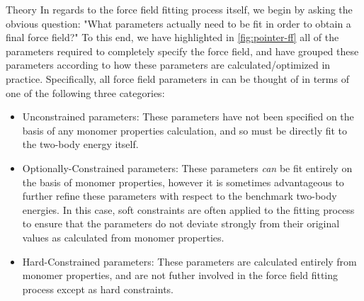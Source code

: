 \begin{subsection}{Theory}
In regards to the force field fitting process itself, we begin by asking the obvious
question: "What parameters actually need to be fit in order to obtain a final
force field?" To this end, we have highlighted in \cref{fig:pointer-ff} all
of the parameters required to completely specify the \mastiff force field, and
have grouped these parameters according to how these parameters are
calculated/optimized
in practice. Specifically, all force field parameters in \mastiff can be thought
of in terms of one of the following three categories:
%
\begin{itemize}
\item \textcolor{fit}{Unconstrained} parameters: These parameters have not
been specified on the basis of any monomer properties calculation, and so must
be directly fit to the two-body energy itself. 
%
\item \textcolor{cfit}{Optionally-Constrained} parameters: These parameters
\emph{can} be fit entirely on the basis of monomer properties, however it is
sometimes advantageous to further refine these parameters with respect to the
benchmark two-body energies. In this case, soft
constraints\cite{Misquitta2016} are often applied to
the fitting process to ensure that the parameters do not deviate strongly from
their original values as calculated from monomer properties.
%
\item \textcolor{mon}{Hard-Constrained} parameters: These parameters are calculated
entirely from monomer properties, and are not futher involved in the force
field fitting process except as hard constraints.
\end{itemize}


\end{subsection}
